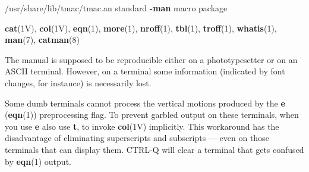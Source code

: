 \begin{manpage}
\begin{files}
\begin{filelist}
\item[/usr/share/lib/tmac/tmac.an]standard {\bf -man} macro package
\end{filelist}\end{files}
\begin{seealso}
{\bf cat}(1V), {\bf col}(1V), {\bf eqn}(1), {\bf more}(1), {\bf
nroff}(1), {\bf tbl}(1), {\bf troff}(1), {\bf whatis}(1), {\bf
man}(7), {\bf catman}(8)
\end{seealso}
\begin{caveats}
The manual is supposed to be reproducible either on a phototypesetter
or on an {\small ASCII} terminal.  However, on a terminal some
information (indicated by font changes, for instance) is necessarily
lost. 

Some dumb terminals cannot process the vertical motions produced
by the {\bf e} ({\bf eqn}(1)) preprocessing flag.  To prevent garbled
output on these terminals, when you use {\bf e} also use {\bf t}, to
invoke {\bf col}(1V) implicitly.  This workaround has the disadvantage
of eliminating superscripts and subscripts --- even on those
terminals that can display them.  {\small CTRL-Q} will clear a
terminal that gets confused by {\bf eqn}(1) output.
\end{caveats}
\end{manpage}